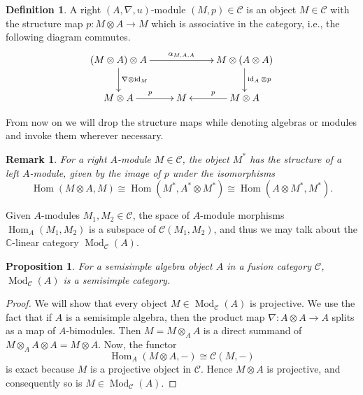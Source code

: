 \documentclass[a4paper, 10pt]{book}
\newtheorem{Prop}[theorem]{Proposition}
\newtheorem{Rem}[theorem]{Remark}
\theoremstyle{definition}
\newtheorem{Def}[theorem]{Definition}
\numberwithin{equation}{chapter}
\newcommand\id{\operatorname{id}}
\newcommand\ot{\otimes}
\newcommand\Hom{\operatorname{Hom}}
\newcommand\Mod{\operatorname{Mod}}
\newcommand\kk{\mathbb C}
\newcommand\C{\mathcal C}
\begin{document}
\begin{Def}
A right $(A, \nabla, u)$-module  $(M, p) \in \C$ is an object $M\in \C$ with the structure map $p: M \ot A\rightarrow M$ which is associative in the category, i.e., the following diagram commutes. \[
\xymatrix{
	(M \ot A)\ot A \ar[rr]^{\alpha_{M,A,A} } \ar[d]^{\nabla \ot \id_M} & &  M\ot (A \ot A)  \ar[d]^{\id_A \ot p}\\
	 M\ot A \ar[r]^p& M &  M\ot A\ar[l]_p
}
\]
\end{Def}
From now on we will drop the structure maps while denoting algebras or modules and invoke them wherever necessary. 
\begin{Rem}\label{leftmod}\rm
For a right $A$-module $M\in \C$, the object $M^*$ has the structure of a left $A$-module, given by the image of $p$ under the isomorphisms \begin{equation}
	\Hom(M\ot A, M) \cong \Hom(M^*, A^* \ot M^*) \cong \Hom(A\ot M^*, M^*).
\end{equation}
\end{Rem}
Given $A$-modules $M_1,M_2\in \C$, the space of $A$-module morphisms $\Hom_A(M_1, M_2)$ is a subspace of $\C(M_1, M_2)$, and thus we may talk about the $\kk$-linear category $\Mod_\C(A)$. 
\begin{Prop}\label{modcasemisimple}
 For a semisimple algebra object $A$ in a fusion category $\C$, $\Mod_\C(A)$ is a semisimple category.
 \end{Prop}
 \begin{proof}
 We will show that every object $M \in \Mod_\C(A)$ is projective. We use the fact that if $A$ is a semisimple algebra, then the product map $\nabla: A\otimes A \rightarrow A$ splits as a map of $A$-bimodules. Then $M = M\otimes_A A$ is a direct summand of $M\otimes_A A\otimes A= M\otimes A$. Now, the functor \begin{equation}
 	\Hom_A(M \otimes A, -) \cong \C(M, -)
 \end{equation}
 is exact because $M$ is a projective object in $\C$. Hence $M\otimes A$ is projective, and consequently so is $M\in \Mod_\C(A)$.
 \end{proof}
 
\end{document}
